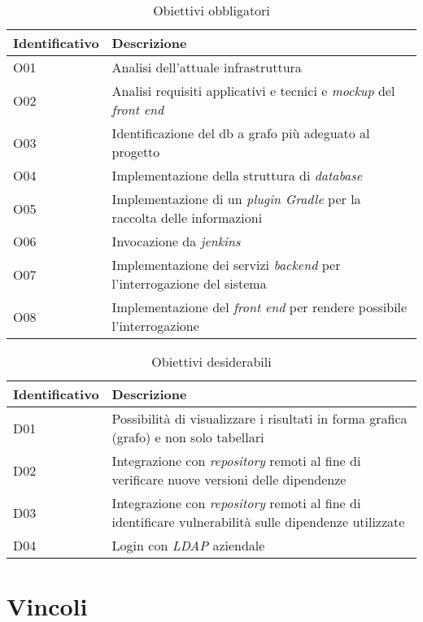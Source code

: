 \begin{table}[!h]
  \caption{Obiettivi obbligatori}
  \label{tab:obiettivi-obbligatori}
\begin{tabularx}{\textwidth}{lX}
   \textbf{Identificativo}&\textbf{Descrizione}\\ 
    \hline O01&Analisi dell'attuale infrastruttura\\
    \hline O02&Analisi requisiti applicativi e tecnici e \textit{mockup} del \textit{front end}\\
    \hline O03&Identificazione del db a grafo più adeguato al progetto\\
    \hline O04&Implementazione della struttura di \textit{database}\\
    \hline O05&Implementazione di un \textit{plugin Gradle} per la raccolta delle informazioni\\
    \hline O06&Invocazione da \textit{jenkins}\\
    \hline O07&Implementazione dei servizi \textit{backend} per l'interrogazione del sistema\\
    \hline O08&Implementazione del \textit{front end} per rendere possibile l'interrogazione\\
    \hline 
\end{tabularx}
\end{table}

  \begin{table}[!h]
    \caption{Obiettivi desiderabili}
    \label{tab:obiettivi-desiderabili}
    \begin{tabularx}{\textwidth}{lX}
    \textbf{Identificativo}&\textbf{Descrizione}\\ 
    \hline D01&Possibilità di visualizzare i risultati in forma grafica (grafo) e non solo tabellari\\
    \hline D02&Integrazione con \textit{repository} remoti al fine di verificare nuove versioni delle dipendenze\\
    \hline D03&Integrazione con \textit{repository} remoti al fine di identificare vulnerabilità sulle dipendenze utilizzate\\
    \hline D04&Login con \textit{LDAP} aziendale\\  
    \hline
  \end{tabularx}
  \end{table}



  \section{Vincoli}
